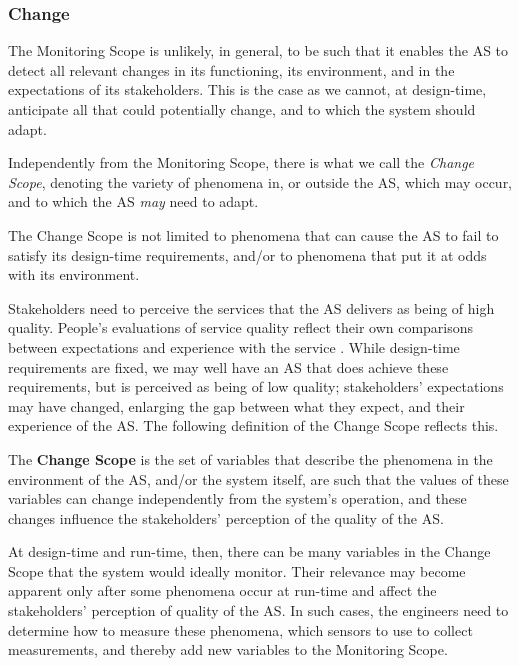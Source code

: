 \documentclass[graybox]{svmult}
\newcommand{\zi}[1]{\textit{#1}}
\newcommand{\xb}[1]{\textbf{#1}}
\newcommand{\AS}{AS}
\newcommand{\MonitoringScope}{Monitoring Scope}
\newcommand{\ChangeScope}{Change Scope}
\begin{document}
%
\subsubsection{Change}\label{s:rpas:premises:change}
The \MonitoringScope{} is unlikely, in general, to be such that it enables the \AS{} to detect all relevant changes in its functioning, its environment, and in the expectations of its stakeholders. This is the case as we cannot, at design-time, anticipate all that could potentially change, and to which the system should adapt.

Independently from the \MonitoringScope, there is what we call the \zi{\ChangeScope}, denoting the variety of phenomena in, or outside the \AS, which may occur, and to which the \AS{} \zi{may} need to adapt.

The \ChangeScope{} is not limited to phenomena that can cause the \AS{} to fail to satisfy its design-time requirements, and/or to phenomena that put it at odds with its environment. 

Stakeholders need to perceive the services that the \AS{} delivers as being of high quality. People's evaluations of service quality reflect their own comparisons between expectations and experience with the service \cite{parasuraman1985conceptual, zeithaml1990delivering, pitt1995service, zeithaml1996behavioral, kettinger2005zones}. While design-time requirements are fixed, we may well have an \AS{} that does achieve these requirements, but is perceived as being of low quality; stakeholders' expectations may have changed, enlarging the gap between what they expect, and their experience of the \AS. The following definition of the \ChangeScope{} reflects this.

\begin{definition}\label{d:change-scope}
The \xb{\ChangeScope{}} is the set of variables that describe the phenomena in the environment of the \AS, and/or the system itself, are such that the values of these variables can change independently from the system's operation, and these changes influence the stakeholders' perception of the quality of the \AS.
\end{definition}

At design-time and run-time, then, there can be many variables in the \ChangeScope{} that the system would ideally monitor. Their relevance may become apparent only after some phenomena occur at run-time and affect the stakeholders' perception of quality of the \AS. In such cases, the engineers need to determine how to measure these phenomena, which sensors to use to collect measurements, and thereby add new variables to the \MonitoringScope.
\end{document}
